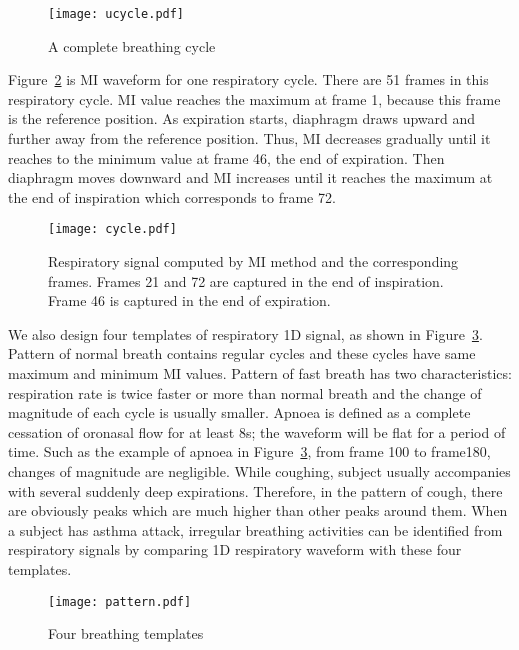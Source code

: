 \begin{figure}[h!]
\centering
\texttt{[image: ucycle.pdf]}
\caption{A complete breathing cycle}
\label{fig.breathcycle}
\end{figure}
Figure~\ref{fig.MIcycle} is MI waveform for one respiratory cycle. There are 51 frames in this respiratory cycle. MI value reaches the maximum at frame 1, because this frame is the reference position. As expiration starts, diaphragm draws upward and further away from the reference position. Thus, MI decreases gradually until it reaches to the minimum value at frame 46, the end of expiration. Then diaphragm moves downward and MI increases until it reaches the maximum at the end of inspiration which corresponds to frame 72.
\begin{figure}[h!]
\centering
\texttt{[image: cycle.pdf]}
\caption{Respiratory signal computed by MI method and the corresponding frames. Frames 21 and 72 are captured in the end of inspiration. Frame 46 is captured in the end of expiration.}
\label{fig.MIcycle}
\end{figure}

We also design four templates of respiratory 1D signal, as shown in Figure~\ref{fig.templates}. Pattern of normal breath contains regular cycles and these cycles have same maximum and minimum MI values. Pattern of fast breath has two characteristics: respiration rate is twice faster or more than normal breath and the change of magnitude of each cycle is usually smaller. Apnoea is defined as a complete cessation of oronasal flow for at least 8s; the waveform will be flat for a period of time. Such as the example of apnoea in Figure~\ref{fig.templates}, from frame 100 to frame180, changes of magnitude are negligible. While coughing, subject usually accompanies with several suddenly deep expirations. Therefore, in the pattern of cough, there are obviously peaks which are much higher than other peaks around them. When a subject has asthma attack, irregular breathing activities can be identified from respiratory signals by comparing 1D respiratory waveform with these four templates.
\begin{figure}[h!]
\centering
\texttt{[image: pattern.pdf]}
\caption{Four breathing templates}
\label{fig.templates}
\end{figure}



